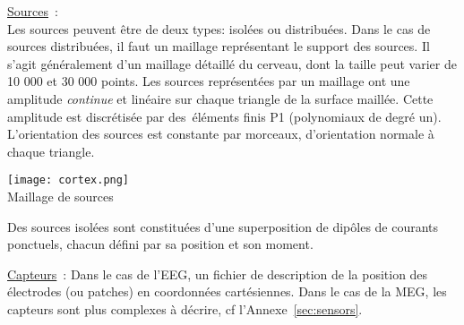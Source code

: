 \noindent
\underline{Sources}~:\\
Les sources peuvent être de deux types: isolées ou distribuées.
\noindent
Dans le cas de sources distribuées, il faut un maillage représentant le support des sources. Il s'agit généralement d'un maillage détaillé du cerveau, dont la taille peut varier de 10 000 et 30 000 points.
Les sources représentées par un maillage ont une amplitude  {\em continue} et linéaire sur chaque triangle de la surface maillée. Cette amplitude est discrétisée par des éléments finis P1 (polynomiaux de degré un).
L'orientation des sources est constante par morceaux, d'orientation normale à chaque triangle.
\begin{center}
    \texttt{[image: cortex.png]}\\
    Maillage de sources
\end{center}
\noindent
Des sources isolées sont constituées d'une superposition de dipôles de courants ponctuels, chacun défini par sa position et son moment.

\noindent
\underline{Capteurs}~:
	Dans le cas de l'EEG, un fichier de description de la position des électrodes (ou patches) en coordonnées cartésiennes.
Dans le cas de la MEG, les capteurs sont plus complexes à décrire, cf l'Annexe~\ref{sec:sensors}.
